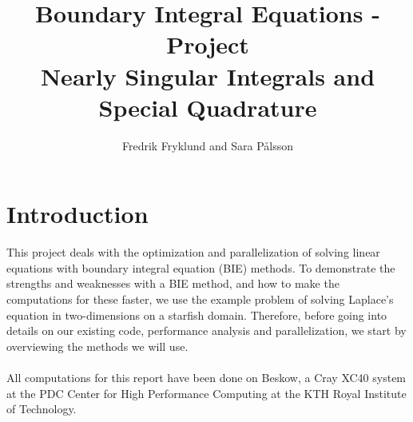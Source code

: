 \documentclass[a4paper,10pt]{article}
\title{Boundary Integral Equations - Project \\ Nearly Singular Integrals and Special Quadrature}
\author{Fredrik Fryklund and Sara P\aa lsson}
\begin{document}
\maketitle

\section*{Introduction}
This project deals with the optimization and parallelization of solving linear equations with boundary integral equation (BIE) methods. To demonstrate the strengths and weaknesses with a BIE method, and how to make the computations for these faster, we use the example problem of solving Laplace's equation in two-dimensions on a starfish domain. Therefore, before going  into details on our existing code, performance analysis and parallelization, we start by overviewing the methods we will use. 
\\ \\
All computations for this report have been done on Beskow, a Cray XC40 system at the PDC Center for High Performance Computing at the KTH Royal Institute of Technology.
\end{document}
